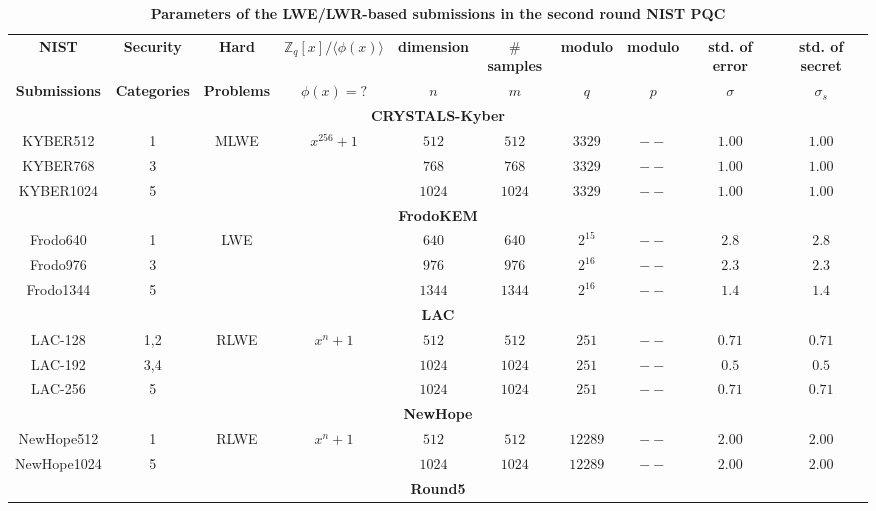 \documentclass{cta-author}
\begin{document}
\begin{table}[pt]
	\centering
	\caption{\textbf{Parameters of the LWE/LWR-based submissions in the second round NIST PQC}}
	\small\addtolength{\tabcolsep}{-4pt}
	\begin{tabular}{ c| c| c | c || c | c | c |c||c| c }
		
		\hline
		\hline
		\textbf{NIST}&\textbf{Security}&\textbf{Hard} &$\mathbb{Z}_q[x]/\langle \phi(x) \rangle$& \textbf{dimension}&$\#$\textbf{samples}&\textbf{modulo}&\textbf{modulo}& \textbf{std. of error}&\textbf{std. of secret}\\
		\textbf{Submissions}&\textbf{Categories}&\textbf{Problems}&$\phi(x)=?$& $n$&$m$&$q$&$p$& $\sigma$&$\sigma_s$\\
		\hline
		\hline
		
		\multicolumn{10}{c}{\textbf{CRYSTALS-Kyber}}\\
		\hline
		KYBER512&1&\multirow{3}{*}{MLWE}&\multirow{3}{*}{$x^{256}+1$}& $512$&$512$&$3329$&$--$& $1.00$&$1.00$\\
		KYBER768&3&&& $768$&$768$&$3329$&$--$& $1.00$&$1.00$\\
		KYBER1024&5&&& $1024$&$1024$&$3329$&$--$& $1.00$&$1.00$\\
		\hline
		\hline
		\multicolumn{10}{c}{\textbf{FrodoKEM}}\\
		\hline
		Frodo640&1&\multirow{3}{*}{LWE}& & $640$&$640$&$2^{15}$&$--$& $2.8$&$2.8$\\
		Frodo976&3&& &$976$&$976$&$2^{16}$&$--$& $2.3$&$2.3$\\
		Frodo1344&5&&& $1344$&$1344$&$2^{16}$&$--$& $1.4$&$1.4$\\
		\hline
		\hline
		\multicolumn{10}{c}{\textbf{LAC}}\\
		\hline
		LAC-128&1,2&\multirow{3}{*}{RLWE}&\multirow{3}{*}{$x^{n}+1$}& $512$&$512$&$251$&$--$& $0.71$&$0.71$\\
		LAC-192&3,4&&& $1024$&$1024$&$251$&$--$& $0.5$&$0.5$\\
		LAC-256&5&&& $1024$&$1024$&$251$&$--$& $0.71$&$0.71$\\
		\hline
		\hline	
		\multicolumn{10}{c}{\textbf{NewHope}}\\
		\hline
		
		NewHope512&1&\multirow{2}{*}{RLWE}&\multirow{2}{*}{$x^{n}+1$}&$512$&$512$&$12289$&$--$& $2.00$&$2.00$\\
		NewHope1024&5&&& $1024$&$1024$&$12289$&$--$& $2.00$&$2.00$\\
		\hline
		\hline
		\multicolumn{10}{c}{\textbf{Round5}}\\
		\hline


\end{tabular}
\end{table}
\end{document}
